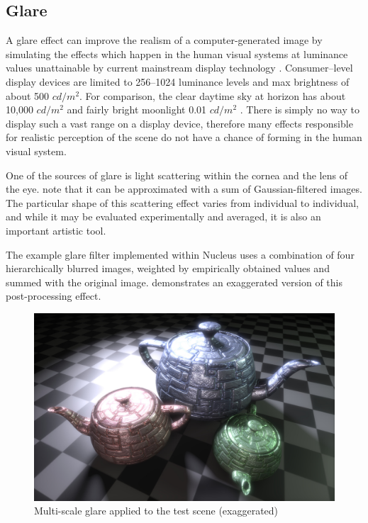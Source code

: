 \subsection{Glare}

A glare effect can improve the realism of a computer-generated image by simulating the effects which happen in the human visual systems at luminance values unattainable by current mainstream display technology \cite{Spencer95physicallybasedglare}. Consumer--level display devices are limited to 256--1024 luminance levels and max brightness of about 500 $cd/m^2$. For comparison, the clear daytime sky at horizon has about 10,000 $cd/m^2$ and fairly bright moonlight 0.01 $cd/m^2$ \cite{radiometryPhotometry}. There is simply no way to display such a vast range on a display device, therefore many effects responsible for realistic perception of the scene do not have a chance of forming in the human visual system.

One of the sources of glare is light scattering within the cornea and the lens of the eye. \citet{Spencer95physicallybasedglare} note that it can be approximated with a sum of Gaussian-filtered images. The particular shape of this scattering effect varies from individual to individual, and while it may be evaluated experimentally and averaged, it is also an important artistic tool.

The example glare filter implemented within Nucleus uses a combination of four hierarchically blurred images, weighted by empirically obtained values and summed with the original image.  demonstrates an exaggerated version of this post-processing effect.

\begin{figure}[ht!]
  \centering
    \includegraphics[width=0.9\linewidth]{./Figures/postProc/glare.jpg}
    \caption[Glare]{Multi-scale glare applied to the test scene (exaggerated)}
  \label{fig:postProcGlare}
\end{figure}

